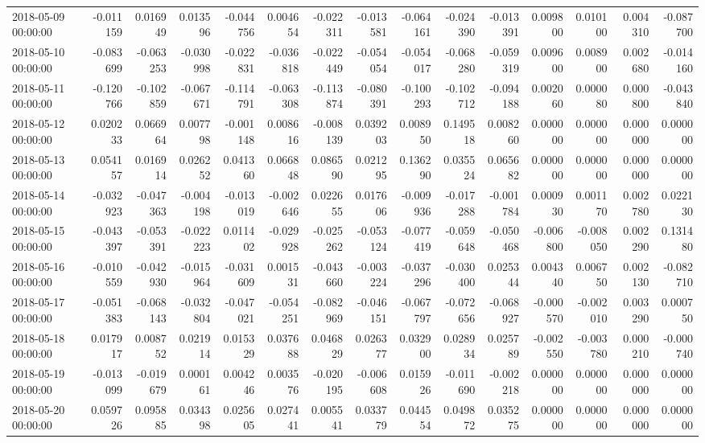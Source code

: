 \begin{tabular}{lrrrrrrrrrrrrrr}
2018-05-09 00:00:00 & -0.011159 & 0.016949 & 0.013596 & -0.044756 & 0.004654 & -0.022311 & -0.013581 & -0.064161 & -0.024390 & -0.013391 & 0.009800 & 0.010100 & 0.004310 & -0.087700 \\
2018-05-10 00:00:00 & -0.083699 & -0.063253 & -0.030998 & -0.022831 & -0.036818 & -0.022449 & -0.054054 & -0.054017 & -0.068280 & -0.059319 & 0.009600 & 0.008900 & 0.002680 & -0.014160 \\
2018-05-11 00:00:00 & -0.120766 & -0.102859 & -0.067671 & -0.114791 & -0.063308 & -0.113874 & -0.080391 & -0.100293 & -0.102712 & -0.094188 & 0.002060 & 0.000080 & 0.000800 & -0.043840 \\
2018-05-12 00:00:00 & 0.020233 & 0.066964 & 0.007798 & -0.001148 & 0.008616 & -0.008139 & 0.039203 & 0.008950 & 0.149518 & 0.008260 & 0.000000 & 0.000000 & 0.000000 & 0.000000 \\
2018-05-13 00:00:00 & 0.054157 & 0.016914 & 0.026252 & 0.041360 & 0.066848 & 0.086590 & 0.021295 & 0.136290 & 0.035524 & 0.065682 & 0.000000 & 0.000000 & 0.000000 & 0.000000 \\
2018-05-14 00:00:00 & -0.032923 & -0.047363 & -0.004198 & -0.013019 & -0.002646 & 0.022655 & 0.017606 & -0.009936 & -0.017288 & -0.001784 & 0.000930 & 0.001170 & 0.002780 & 0.022130 \\
2018-05-15 00:00:00 & -0.043397 & -0.053391 & -0.022223 & 0.011402 & -0.029928 & -0.025262 & -0.053124 & -0.077419 & -0.059648 & -0.050468 & -0.006800 & -0.008050 & 0.002290 & 0.131480 \\
2018-05-16 00:00:00 & -0.010559 & -0.042930 & -0.015964 & -0.031609 & 0.001531 & -0.043660 & -0.003224 & -0.037296 & -0.030400 & 0.025344 & 0.004340 & 0.006750 & 0.002130 & -0.082710 \\
2018-05-17 00:00:00 & -0.051383 & -0.068143 & -0.032804 & -0.047021 & -0.054251 & -0.082969 & -0.046151 & -0.067797 & -0.072656 & -0.068927 & -0.000570 & -0.002010 & 0.003290 & 0.000750 \\
2018-05-18 00:00:00 & 0.017917 & 0.008752 & 0.021914 & 0.015329 & 0.037688 & 0.046829 & 0.026377 & 0.032900 & 0.028934 & 0.025789 & -0.002550 & -0.003780 & 0.000210 & -0.000740 \\
2018-05-19 00:00:00 & -0.013099 & -0.019679 & 0.000161 & 0.004246 & 0.003576 & -0.020195 & -0.006608 & 0.015926 & -0.011690 & -0.002218 & 0.000000 & 0.000000 & 0.000000 & 0.000000 \\
2018-05-20 00:00:00 & 0.059726 & 0.095885 & 0.034398 & 0.025605 & 0.027441 & 0.005541 & 0.033779 & 0.044554 & 0.049872 & 0.035275 & 0.000000 & 0.000000 & 0.000000 & 0.000000 \\

\end{tabular}
